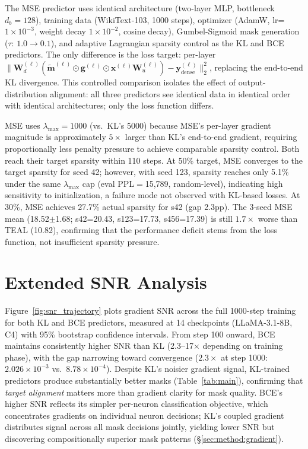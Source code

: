 The MSE predictor uses identical architecture (two-layer MLP, bottleneck $d_b{=}128$), training data (WikiText-103, 1000 steps), optimizer (AdamW, lr=$1{\times}10^{-3}$, weight decay $1{\times}10^{-2}$, cosine decay), Gumbel-Sigmoid mask generation ($\tau$: $1.0 \to 0.1$), and adaptive Lagrangian sparsity control as the KL and BCE predictors.
The only difference is the loss target: per-layer $\|\mathbf{W}_d^{(\ell)}(\tilde{\mathbf{m}}^{(\ell)} \odot \mathbf{g}^{(\ell)} \odot \mathbf{x}^{(\ell)} \mathbf{W}_u^{(\ell)}) - \mathbf{y}_{\text{dense}}^{(\ell)}\|_2^2$, replacing the end-to-end KL divergence.
This controlled comparison isolates the effect of output-distribution alignment: all three predictors see identical data in identical order with identical architectures; only the loss function differs. %

MSE uses $\lambda_{\max}{=}1000$ (vs.\ KL's 5000) because MSE's per-layer gradient magnitude is approximately $5\times$ larger than KL's end-to-end gradient, requiring proportionally less penalty pressure to achieve comparable sparsity control. Both reach their target sparsity within 110 steps.
At 50\% target, MSE converges to the target sparsity for seed 42; however, with seed 123, sparsity reaches only 5.1\% under the same $\lambda_{\max}$ cap (eval PPL$=$15{,}789, random-level), indicating high sensitivity to initialization, a failure mode not observed with KL-based losses.
At 30\%, MSE achieves 27.7\% actual sparsity for s42 (gap 2.3pp).
The 3-seed MSE mean (18.52$\pm$1.68; s42=20.43, s123=17.73, s456=17.39) is still $1.7\times$ worse than TEAL (10.82), confirming that the performance deficit stems from the loss function, not insufficient sparsity pressure.


\section{Extended SNR Analysis}
\label{app:snr_extended}

Figure~\ref{fig:snr_trajectory} plots gradient SNR across the full 1000-step training for both KL and BCE predictors, measured at 14 checkpoints (LLaMA-3.1-8B, C4) with 95\% bootstrap confidence intervals.
From step 100 onward, BCE maintains consistently higher SNR than KL (2.3--17$\times$ depending on training phase), with the gap narrowing toward convergence ($2.3\times$ at step 1000: $2.026{\times}10^{-3}$ vs.\ $8.78{\times}10^{-4}$). %
Despite KL's noisier gradient signal, KL-trained predictors produce substantially better masks (Table~\ref{tab:main}), confirming that \emph{target alignment} matters more than gradient clarity for mask quality.
BCE's higher SNR reflects its simpler per-neuron classification objective, which concentrates gradients on individual neuron decisions; KL's coupled gradient distributes signal across all mask decisions jointly, yielding lower SNR but discovering compositionally superior mask patterns (\S\ref{sec:method:gradient}).

